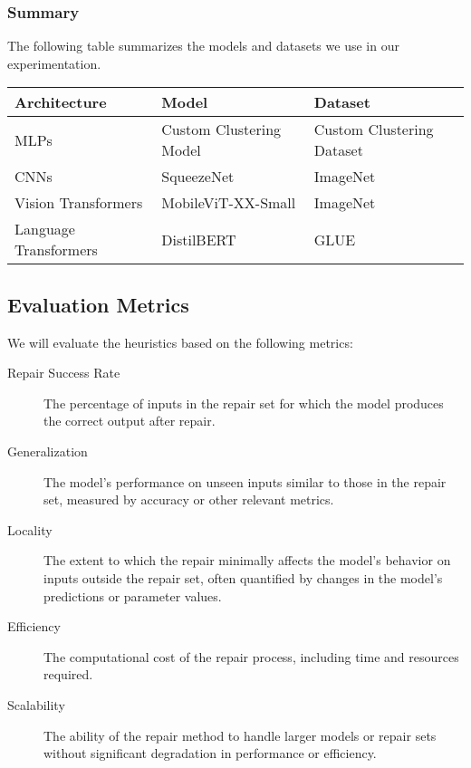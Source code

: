 \documentclass{article}
\begin{document}
\subsubsection{Summary}

The following table summarizes the models and datasets we use in our experimentation.

\begin{longtable}{p{} p{} p{}}
	\toprule
	\textbf{Architecture} & \textbf{Model}                      & \textbf{Dataset}          \\
	\midrule
	\endhead
	\bottomrule
	\endfoot
	\bottomrule
	\endlastfoot
	MLPs                  & Custom Clustering Model             & Custom Clustering Dataset \\
	\midrule
	CNNs                  & SqueezeNet \cite{squeezenet}        & ImageNet \cite{imagenet}  \\
	\midrule
	Vision Transformers   & MobileViT-XX-Small \cite{mobilevit} & ImageNet \cite{imagenet}  \\
	\midrule
	Language Transformers & DistilBERT \cite{distilbert}        & GLUE \cite{GLUE}          \\
\end{longtable}

\subsection{Evaluation Metrics}
We will evaluate the heuristics based on the following metrics:
\begin{description}
	\item[Repair Success Rate] The percentage of inputs in the repair set for which the model produces the correct output after repair.
	\item[Generalization] The model's performance on unseen inputs similar to those in the repair set, measured by accuracy or other relevant metrics.
	\item[Locality] The extent to which the repair minimally affects the model's behavior on inputs outside the repair set, often quantified by changes in the model's predictions or parameter values.
	\item[Efficiency] The computational cost of the repair process, including time and resources required.
	\item[Scalability] The ability of the repair method to handle larger models or repair sets without significant degradation in performance or efficiency.
\end{description}


\newpage


\end{document}
